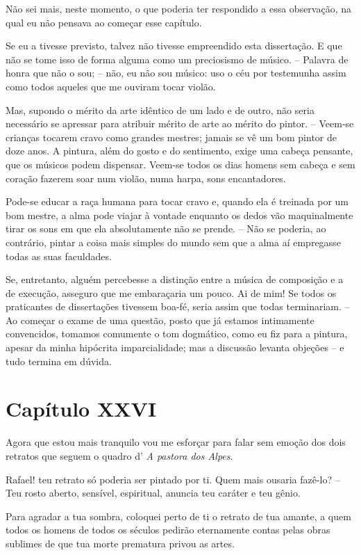  Não sei mais, neste momento, o que poderia ter respondido a essa
observação, na qual eu não pensava ao começar esse capítulo.

 Se eu a tivesse previsto, talvez não tivesse empreendido esta
dissertação. E que não se tome isso de forma alguma como um preciosismo
de músico. -- Palavra de honra que não o sou; -- não, eu não sou
músico: uso o céu por testemunha assim como todos aqueles que me
ouviram tocar violão.

 Mas, supondo o mérito da arte idêntico de um lado e de outro, não seria
necessário se apressar para atribuir mérito de arte ao mérito do
pintor. -- Veem-se crianças tocarem cravo como grandes mestres; jamais
se vê um bom pintor de doze anos. A pintura, além do gosto e do
sentimento, exige uma cabeça pensante, que os músicos podem dispensar.
Veem-se todos os dias homens sem cabeça e sem coração fazerem soar num
violão, numa harpa, sons encantadores. 

 Pode-se educar a raça humana para tocar cravo e, quando ela é treinada
por um bom mestre, a alma pode viajar à vontade enquanto os dedos vão
maquinalmente tirar os sons em que ela absolutamente não se prende. --
Não se poderia, ao contrário, pintar a coisa mais simples do mundo sem
que a alma aí empregasse todas as suas faculdades.

 Se, entretanto, alguém percebesse a distinção entre a música de
composição e a de execução, asseguro que me embaraçaria um pouco. Ai de
mim! Se todos os praticantes de dissertações tivessem boa-fé, seria
assim que todas terminariam. -- Ao começar o exame de uma questão,
posto que já estamos intimamente convencidos, tomamos comumente o tom
dogmático, como eu fiz para a pintura, apesar da minha hipócrita
imparcialidade; mas a discussão levanta objeções -- e tudo termina em
dúvida.

\section{Capítulo XXVI}

 Agora que estou mais tranquilo vou me esforçar para falar sem emoção
dos dois retratos que seguem o quadro d’ \textit{A pastora dos Alpes}. 

 Rafael! teu retrato só poderia ser pintado por ti. Quem mais ousaria
fazê-lo? -- Teu rosto aberto, sensível, espiritual, anuncia teu
caráter e teu gênio.

 Para agradar a tua sombra, coloquei perto de ti o retrato de tua
amante, a quem todos os homens de todos os séculos pedirão eternamente
contas pelas obras sublimes de que tua morte prematura privou as artes.


